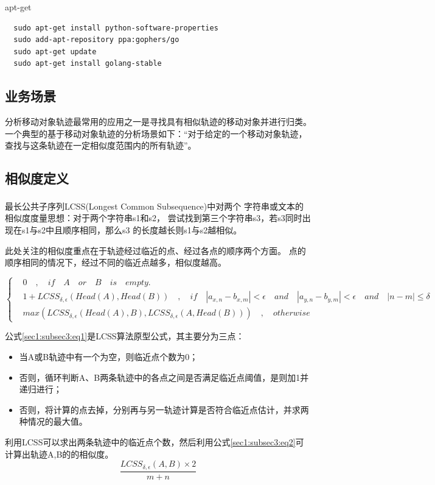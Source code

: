 \documentclass[UTF8]{ctexart}
\newcommand{\supercite}[1]{\textsuperscript{\cite{#1}}}
\begin{document}
apt-get
\begin{lstlisting}
  sudo apt-get install python-software-properties
  sudo add-apt-repository ppa:gophers/go
  sudo apt-get update
  sudo apt-get install golang-stable
\end{lstlisting}
\subsection{业务场景}
分析移动对象轨迹最常用的应用之一是寻找具有相似轨迹的移动对象并进行归类。一个典型的基于移动对象轨迹的分析场景如下：“对于给定的一个移动对象轨迹，查找与这条轨迹在一定相似度范围内的所有轨迹”。

\subsection{相似度定义}
\label{sec1:subsec3}
最长公共子序列LCSS(Longest Common Subsequence)\supercite{lcss}中对两个 字符串或文本的相似度度量思想：对于两个字符串s1和s2， 尝试找到第三个字符串s3，若s3同时出现在s1与s2中且顺序相同，那么s3 的长度越长则s1与s2越相似。

此处关注的相似度重点在于轨迹经过临近的点、经过各点的顺序两个方面。
点的顺序相同的情况下，经过不同的临近点越多，相似度越高。

\begin{equation}
\label{sec1:subsec3:eq1}
\left\{
\begin{aligned}
& 0 \quad , \quad if \quad A \quad or \quad B \quad is \quad empty. \\
& 1+LCSS_{\delta,\epsilon}(Head(A),Head(B))\quad , \quad if \quad |a_{x,n}-b_{x,m}|<\epsilon \quad and \quad |a_{y,n}-b_{y,m}|<\epsilon \quad and \quad |n-m|\leq \delta \\
& max(LCSS_{\delta,\epsilon}(Head(A),B),LCSS_{\delta,\epsilon}(A,Head(B))) \quad , \quad otherwise
\end{aligned}
\right.
\end{equation}

公式\ref{sec1:subsec3:eq1}是LCSS算法原型公式，其主要分为三点：
\begin{itemize}
	\item 当A或B轨迹中有一个为空，则临近点个数为0；
	\item 否则，循环判断A、B两条轨迹中的各点之间是否满足临近点阈值，是则加1并递归进行；
	\item 否则，将计算的点去掉，分别再与另一轨迹计算是否符合临近点估计，并求两种情况的最大值。
\end{itemize}

利用LCSS可以求出两条轨迹中的临近点个数，然后利用公式\ref{sec1:subsec3:eq2}可计算出轨迹A,B的的相似度。
\begin{equation}
\label{sec1:subsec3:eq2}
\frac{LCSS_{\delta,\epsilon}(A,B)\times2}{m+n}
\end{equation}
\end{document}
